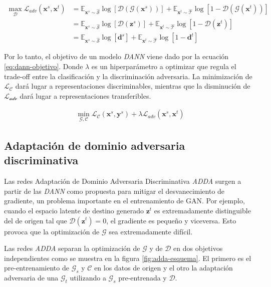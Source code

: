\begin{align}
  \max_{\mathcal{D}} \mathcal{L}_{adv}(\mathbf{x}^s, \mathbf{x}^t) & = \mathbb{E}_{\mathbf{x}^s \sim \mathcal{\hat{S}}}\log[\mathcal{D}(\mathcal{G}(\mathbf{x}^s))] + \mathbb{E}_{\mathbf{x}^t \sim \mathcal{\hat{T}}}\log[1-\mathcal{D}(\mathcal{G}(\mathbf{x}^t))] \nonumber \\
                                                                   & = \mathbb{E}_{\mathbf{x}^s \sim \mathcal{\hat{S}}}\log[\mathcal{D}(\mathbf{z}^s)] + \mathbb{E}_{\mathbf{x}^t \sim \mathcal{\hat{T}}}\log[1-\mathcal{D}(\mathbf{z}^t)] \nonumber                           \\
                                                                   & = \mathbb{E}_{\mathbf{x}^s \sim \mathcal{\hat{S}}}\log[\mathbf{d}^s] + \mathbb{E}_{\mathbf{x}^t \sim \mathcal{\hat{T}}}\log[1-\mathbf{d}^t]
  \label{eq:dann-loss-discriminadora}
\end{align}

Por lo tanto, el objetivo de un modelo {\it DANN} viene dado por la ecuación \ref{eq:dann-objetivo}. Donde $\lambda$ es
un hiperparámetro a optimizar que regula el trade-off entre la clasificación y la discriminación adversaria. La
minimización de $\mathcal{L}_\mathcal{C}$ dará lugar a representaciones discriminables, mientras que la disminución de
$\mathcal{L}_\mathcal{adv}$ dará lugar a representaciones transferibles.

\begin{align}
  \min_{\mathcal{G},\mathcal{C}} \mathcal{L}_\mathcal{C}(\mathbf{x}^s, \mathbf{y}^s) + \lambda \mathcal{L}_{adv}(\mathbf{x}^s, \mathbf{x}^t)
  \label{eq:dann-objetivo}
\end{align}

\subsection{Adaptación de dominio adversaria discriminativa}
Las redes Adaptación de Dominio Adversaria Discriminativa {\it ADDA} \parencite{tzeng2017adversarial} surgen a partir de las {\it DANN} como propuesta para mitigar el desvanecimiento de
gradiente, un problema importante en el entrenamiento de GAN. Por ejemplo, cuando el espacio latente de destino
generado $\mathbf{z}^t$ es extremadamente distinguible del de origen tal que $\mathcal{D}(\mathbf{z}^t)=0$, el
gradiente es pequeño y viceversa. Esto provoca que la optimización de $\mathcal{G}$ sea extremadamente difícil.

Las redes {\it ADDA} separan la optimización de $\mathcal{G}$ y de $\mathcal{D}$ en dos objetivos independientes como
se muestra en la figura \ref{fig:adda-esquema}. El primero es el pre-entrenamiento de $\mathcal{G}_s$ y $\mathcal{C}$
en los datos de origen y el otro la adaptación adversaria de una $\mathcal{G}_t$ utilizando a $\mathcal{G}_s$
pre-entrenada y $\mathcal{D}$.

